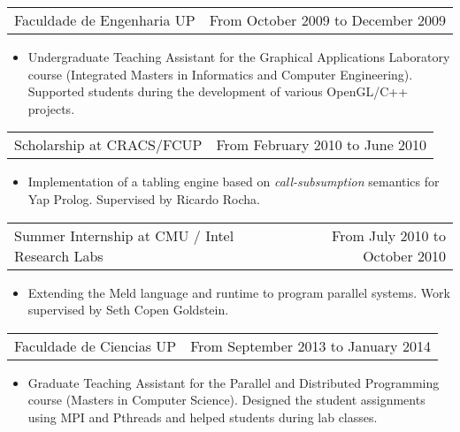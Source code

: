 \documentclass[margin]{res}
\begin{document}
\begin{resume}
                  \begin{tabular}{p{3in} r} %
                    Faculdade de Engenharia UP &  From October 2009 to December 2009
                   \end{tabular}
                    \begin{itemize}					        
                     \item[] Undergraduate Teaching Assistant for the Graphical Applications Laboratory course (Integrated Masters in Informatics and Computer Engineering). Supported students during the development of various OpenGL/C++ projects.
                    \end{itemize}
                    
                  \begin{tabular}{p{3in} r}
                    Scholarship at CRACS/FCUP & From February 2010 to June 2010
                  \end{tabular}
                  \begin{itemize}
                    \item[] Implementation of a tabling engine based on \textit{call-subsumption} semantics for Yap Prolog. Supervised by Ricardo Rocha.
                  \end{itemize}
                  
                  \begin{tabular}{p{3in} r}
                    Summer Internship at CMU / Intel Research Labs & From July 2010 to October 2010
                  \end{tabular}
                  \begin{itemize}
                    \item[] Extending the Meld language and runtime to program parallel systems. Work supervised by Seth Copen Goldstein.
                  \end{itemize}
                  \clearpage
                  
                  \begin{tabular}{p{3in} r} %
                    Faculdade de Ciencias UP &  From September 2013 to January 2014
                   \end{tabular}
                    \begin{itemize}					        
                     \item[] Graduate Teaching Assistant for the Parallel and Distributed Programming course (Masters in Computer Science). Designed the student assignments using MPI and Pthreads and helped students during lab classes.
                    \end{itemize}


\end{resume}
\end{document}
